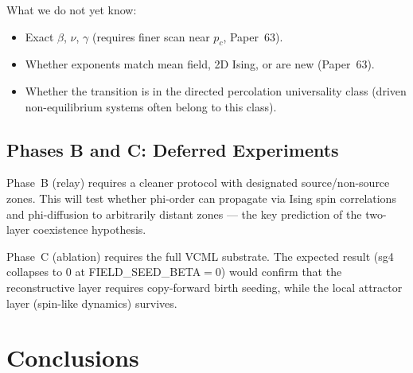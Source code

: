 \documentclass[12pt,a4paper]{article}
\begin{document}
What we do not yet know:
\begin{itemize}
  \item Exact $\beta$, $\nu$, $\gamma$ (requires finer scan near $p_c$, Paper~63).
  \item Whether exponents match mean field, 2D Ising, or are new (Paper~63).
  \item Whether the transition is in the directed percolation universality class
    (driven non-equilibrium systems often belong to this class).
\end{itemize}

\subsection{Phases B and C: Deferred Experiments}

Phase~B (relay) requires a cleaner protocol with designated source/non-source zones.
This will test whether phi-order can propagate via Ising spin correlations
and phi-diffusion to arbitrarily distant zones --- the key prediction of the
two-layer coexistence hypothesis.

Phase~C (ablation) requires the full VCML substrate.
The expected result (sg4 collapses to 0 at FIELD\_SEED\_BETA$= 0$) would confirm
that the reconstructive layer requires copy-forward birth seeding, while the
local attractor layer (spin-like dynamics) survives.

\section{Conclusions}
\label{sec:conclusions}
\end{document}
